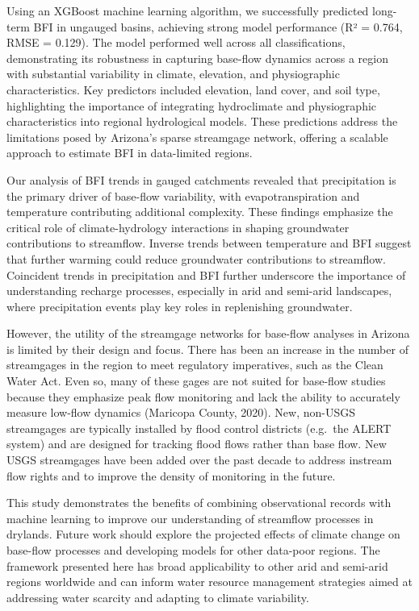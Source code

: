 \documentclass[
]{agujournal2019}
\begin{document}
Using an XGBoost machine learning algorithm, we successfully predicted
long-term BFI in ungauged basins, achieving strong model performance (R²
= 0.764, RMSE = 0.129). The model performed well across all
classifications, demonstrating its robustness in capturing base-flow
dynamics across a region with substantial variability in climate,
elevation, and physiographic characteristics. Key predictors included
elevation, land cover, and soil type, highlighting the importance of
integrating hydroclimate and physiographic characteristics into regional
hydrological models. These predictions address the limitations posed by
Arizona's sparse streamgage network, offering a scalable approach to
estimate BFI in data-limited regions.

Our analysis of BFI trends in gauged catchments revealed that
precipitation is the primary driver of base-flow variability, with
evapotranspiration and temperature contributing additional complexity.
These findings emphasize the critical role of climate-hydrology
interactions in shaping groundwater contributions to streamflow. Inverse
trends between temperature and BFI suggest that further warming could
reduce groundwater contributions to streamflow. Coincident trends in
precipitation and BFI further underscore the importance of understanding
recharge processes, especially in arid and semi-arid landscapes, where
precipitation events play key roles in replenishing groundwater.

However, the utility of the streamgage networks for base-flow analyses
in Arizona is limited by their design and focus. There has been an
increase in the number of streamgages in the region to meet regulatory
imperatives, such as the Clean Water Act. Even so, many of these gages
are not suited for base-flow studies because they emphasize peak flow
monitoring and lack the ability to accurately measure low-flow dynamics
(Maricopa County, 2020). New, non-USGS streamgages are typically
installed by flood control districts (e.g.~the ALERT system) and are
designed for tracking flood flows rather than base flow. New USGS
streamgages have been added over the past decade to address instream
flow rights and to improve the density of monitoring in the future.

This study demonstrates the benefits of combining observational records
with machine learning to improve our understanding of streamflow
processes in drylands. Future work should explore the projected effects
of climate change on base-flow processes and developing models for other
data-poor regions. The framework presented here has broad applicability
to other arid and semi-arid regions worldwide and can inform water
resource management strategies aimed at addressing water scarcity and
adapting to climate variability.
\end{document}
